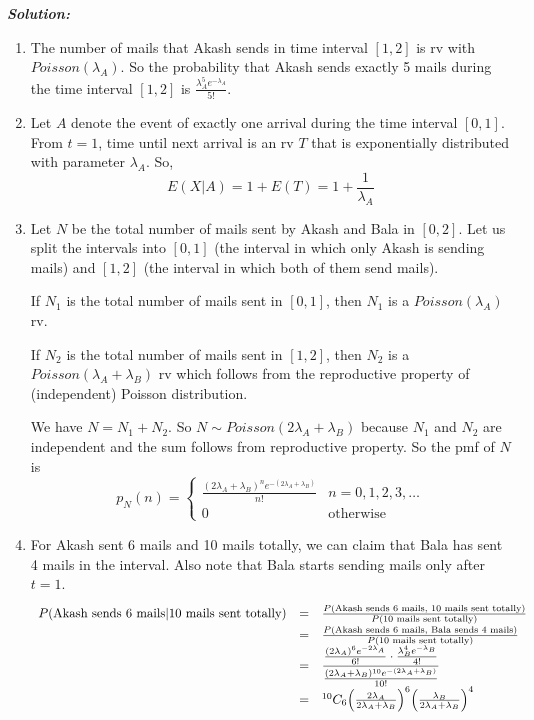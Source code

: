 \documentclass[12pt, oneside]{article}
\begin{document}
\begin{enumerate}
\textbf{\textit{Solution:}}

\begin{enumerate}[label=(\alph*)]

\item The number of mails that Akash sends in time interval $[1,2]$ is rv with $Poisson(\lambda_A)$. So the probability that Akash sends exactly 5 mails during the time interval $[1,2]$ is $\frac{\lambda_A^5 e^{-\lambda_A}}{5!}$.

\item Let $A$ denote the event of exactly one arrival during the time interval $[0,1]$. From $t=1$, time until next arrival is an rv $T$ that is exponentially distributed with parameter $\lambda_A$. So, 
\[ E(X|A) = 1 + E(T) = 1 + \frac{1}{\lambda_A} \]

\item 
    Let $N$ be the total number of mails sent by Akash and Bala in $[0,2]$. Let us split the intervals into $[0,1]$ (the interval in which only Akash is sending mails) and  $[1,2]$ (the interval in which both of them send mails). 
    
    If $N_1$ is the total number of mails sent in $[0,1]$, then $N_1$ is a $Poisson(\lambda_A)$ rv.
    
    If $N_2$ is the total number of mails sent in  $[1,2]$, then $N_2$ is a $Poisson(\lambda_A+\lambda_B)$ rv which follows from the reproductive property of (independent) Poisson distribution.
    
    We have $N=N_1+N_2$. So $N \sim Poisson(2\lambda_A+\lambda_B)$ because $N_1$ and $N_2$ are independent and the sum follows from reproductive property. So the pmf of $N$ is 
    \[ p_N(n) = 
    \begin{cases}
    \frac{(2\lambda_A+\lambda_B)^ne^{-(2\lambda_A+\lambda_B)}}{n!} & n=0,1,2,3,\dots \\
    0 & \text{otherwise}
    \end{cases}
    \]

\item   For Akash sent 6 mails and 10 mails totally, we can claim that Bala has sent 4 mails in the interval. Also note that Bala starts sending mails only after $t=1$.
        \[\def\arraystretch{1.4}
            \begin{array}{lcl}
                P(\text{Akash sends 6 mails}|\text{10 mails sent totally}) & = & \frac{P(\text{Akash sends 6 mails}, \text{ 10 mails sent totally})}{P(\text{10 mails sent totally})} \\
                ~ & = & \frac{P(\text{Akash sends 6 mails}, \text{ Bala sends 4 mails})}{P(\text{10 mails sent totally})} \\
                ~ & = & \dfrac{\frac{(2\lambda_A)^6 e^{-2\lambda_A}}{6!} \cdot \frac{\lambda_B^4 e^{-\lambda_B}}{4!}} {\frac{(2\lambda_A+\lambda_B)^{10}e^{-(2\lambda_A+\lambda_B)}}{10!}} \\
                ~ & = & ^{10}C_6 \Big(\frac{2\lambda_A}{2\lambda_A+\lambda_B}\Big)^6 \Big(\frac{\lambda_B}{2\lambda_A+\lambda_B}\Big)^4
            \end{array}
        \]\\
        


\end{enumerate}
\end{enumerate}
\end{document}
